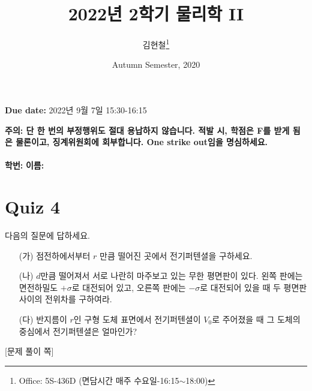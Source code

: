 \documentclass[tightenlines,floatfix,nofootinbib,superscriptaddress,fleqn]{revtex4}
\begin{document}
\title{\Large 2022년 2학기 물리학 II}
\author{김현철\footnote{Office: 5S-436D (면담시간 매주
    수요일-16:15$\sim$18:00)}} 
\date{Autumn Semester, 2020}

\maketitle

{\color{red} {\bf Due date:} 2022년 9월 7일  15:30-16:15 }
\vspace{1.cm}

\noindent \textbf{ 주의: \color{blue} 단 한 번의 부정행위도 절대
  용납하지 않습니다. 적발 시, 학점은 F를 받게 됨은 물론이고,
  징계위원회에 회부합니다. One strike out임을 명심하세요.} 
\\
\\

{\bf 학번:} \hspace{4cm}
{\bf 이름:} 

\section*{\large Quiz 4}
 다음의 질문에 답하세요.
\begin{itemize}
\item[(가)] 점전하에서부터 $r$ 만큼 떨어진 곳에서 전기퍼텐셜을
  구하세요.
\item[(나)] $d$만큼 떨어져서 서로 나란히 마주보고 있는 무한 평면판이
  있다. 왼쪽 판에는 면전하밀도 $+\sigma$로 대전되어 있고, 오른쪽
  판에는 $-\sigma$로 대전되어 있을 때 두 평면판 사이의 전위차를
  구하여라. 
\item[(다)] 반지름이 $r$인 구형 도체 표면에서 전기퍼텐셜이 $V_0$로
  주어졌을 때 그 도체의 중심에서 전기퍼텐셜은 얼마인가? 
\end{itemize}
\newpage
{\color{gray} [문제 풀이 쪽]}
\newpage
\end{document}
